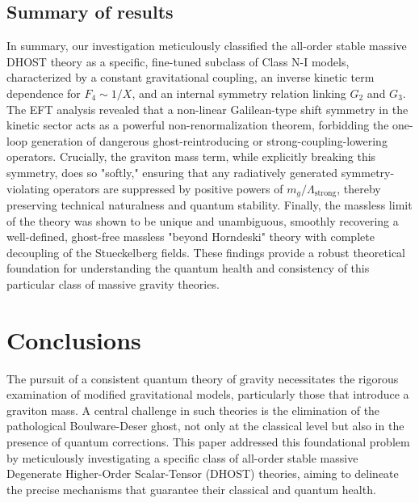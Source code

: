 \documentclass[twocolumn]{aastex631}
\begin{document}
\subsection{Summary of results}
In summary, our investigation meticulously classified the all-order stable massive DHOST theory as a specific, fine-tuned subclass of Class N-I models, characterized by a constant gravitational coupling, an inverse kinetic term dependence for $F_4 \sim 1/X$, and an internal symmetry relation linking $G_2$ and $G_3$. The EFT analysis revealed that a non-linear Galilean-type shift symmetry in the kinetic sector acts as a powerful non-renormalization theorem, forbidding the one-loop generation of dangerous ghost-reintroducing or strong-coupling-lowering operators. Crucially, the graviton mass term, while explicitly breaking this symmetry, does so "softly," ensuring that any radiatively generated symmetry-violating operators are suppressed by positive powers of $m_g/\Lambda_{\text{strong}}$, thereby preserving technical naturalness and quantum stability. Finally, the massless limit of the theory was shown to be unique and unambiguous, smoothly recovering a well-defined, ghost-free massless "beyond Horndeski" theory with complete decoupling of the Stueckelberg fields. These findings provide a robust theoretical foundation for understanding the quantum health and consistency of this particular class of massive gravity theories.

\section{Conclusions}
\label{sec:conclusions}

The pursuit of a consistent quantum theory of gravity necessitates the rigorous examination of modified gravitational models, particularly those that introduce a graviton mass. A central challenge in such theories is the elimination of the pathological Boulware-Deser ghost, not only at the classical level but also in the presence of quantum corrections. This paper addressed this foundational problem by meticulously investigating a specific class of all-order stable massive Degenerate Higher-Order Scalar-Tensor (DHOST) theories, aiming to delineate the precise mechanisms that guarantee their classical and quantum health.
\end{document}
